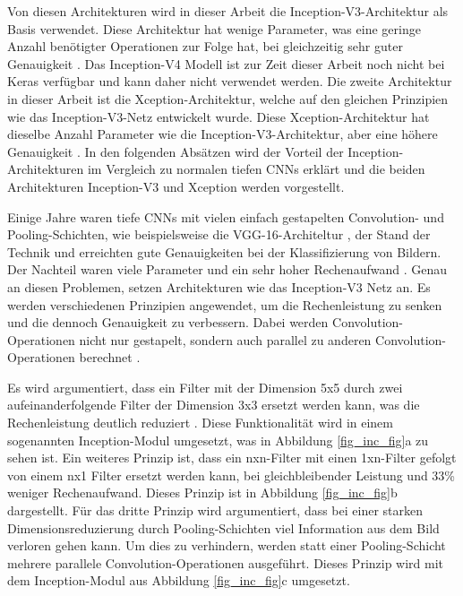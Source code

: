 Von diesen Architekturen wird in dieser Arbeit die Inception-V3-Architektur \cite{szegedy2016inception} als Basis verwendet. Diese Architektur hat wenige Parameter, was eine geringe Anzahl benötigter Operationen zur Folge hat, bei gleichzeitig sehr guter Genauigkeit \cite{canziani2016analysis}. Das Inception-V4 Modell ist zur Zeit dieser Arbeit noch nicht bei Keras verfügbar und kann daher nicht verwendet werden. Die zweite Architektur in dieser Arbeit ist die Xception-Architektur, welche auf den gleichen Prinzipien wie das Inception-V3-Netz entwickelt wurde. Diese Xception-Architektur hat dieselbe Anzahl Parameter wie die Inception-V3-Architektur, aber eine höhere Genauigkeit \cite{chollet2017xception}. In den folgenden Absätzen wird der Vorteil der Inception-Architekturen im Vergleich zu normalen tiefen \acp{CNN} erklärt und die beiden Architekturen Inception-V3 und Xception werden vorgestellt.

Einige Jahre waren tiefe \acp{CNN} mit vielen einfach gestapelten Convolution- und Pooling-Schichten, wie beispielsweise die VGG-16-Architeltur \cite{simonyan2014vgg}, der Stand der Technik und erreichten gute Genauigkeiten bei der Klassifizierung von Bildern. Der Nachteil waren viele Parameter und ein sehr hoher Rechenaufwand \cite{canziani2016analysis}. Genau an diesen Problemen, setzen Architekturen wie das Inception-V3 Netz an. Es werden verschiedenen Prinzipien angewendet, um die Rechenleistung zu senken und die dennoch Genauigkeit zu verbessern. Dabei werden Convolution-Operationen nicht nur gestapelt, sondern auch parallel zu anderen Convolution-Operationen berechnet \cite{szegedy2016inception}. 

Es wird argumentiert, dass ein Filter mit der Dimension 5x5 durch zwei aufeinanderfolgende Filter der Dimension 3x3 ersetzt werden kann, was die Rechenleistung deutlich reduziert \cite{szegedy2016inception}. Diese Funktionalität wird in einem sogenannten Inception-Modul umgesetzt, was in Abbildung \ref{fig_inc_fig}a zu sehen ist. Ein weiteres Prinzip ist, dass ein nxn-Filter mit einen 1xn-Filter gefolgt von einem nx1 Filter ersetzt werden kann, bei gleichbleibender Leistung und 33\% weniger Rechenaufwand. Dieses Prinzip ist in Abbildung \ref{fig_inc_fig}b dargestellt. Für das dritte Prinzip wird argumentiert, dass bei einer starken Dimensionsreduzierung durch Pooling-Schichten viel Information aus dem Bild verloren gehen kann. Um dies zu verhindern, werden statt einer Pooling-Schicht mehrere parallele Convolution-Operationen ausgeführt. Dieses Prinzip wird mit dem Inception-Modul aus Abbildung \ref{fig_inc_fig}c umgesetzt.

